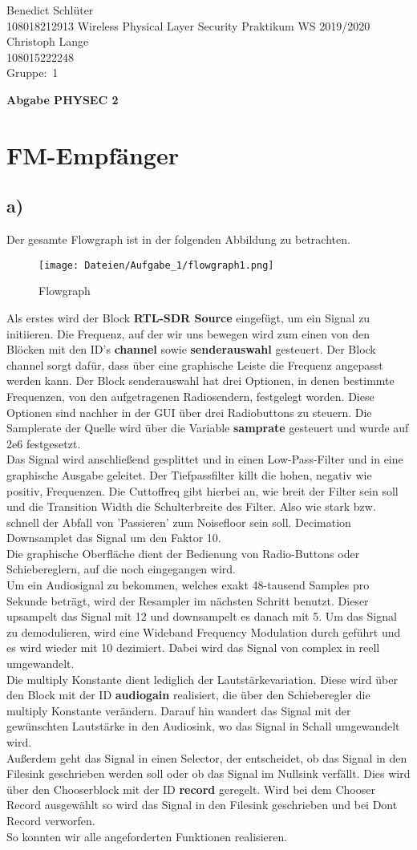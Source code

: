 \documentclass[12pt,a4paper]{article}
\newcommand{\student}{Benedict Schlüter\\ 108018212913 } %
\newcommand{\partner}{Christoph Lange\\ 108015222248} %
\newcommand{\group}{1} %
\newcommand{\hwheadtwo}{$ $
  \vspace{-2cm}
  
\noindent \student \qquad \qquad  Wireless Physical Layer Security Praktikum \hfill WS 2019/2020 \\
\noindent \partner \\
\noindent Gruppe:~\group\\
$ $

  
\begin{center}    
{\Large \bf Abgabe PHYSEC 2}
\end{center}
}
\begin{document}
\hwheadtwo

\section{FM-Empfänger}
\subsection*{a)}
Der gesamte Flowgraph ist in der folgenden Abbildung zu betrachten. 
\begin{figure}[H]
\centering
\texttt{[image: Dateien/Aufgabe\_1/flowgraph1.png]} 
\caption{Flowgraph}
\label{fig:1_1}
\end{figure}
Als erstes wird der Block \textbf{RTL-SDR Source} eingefügt, um ein Signal zu initiieren. Die Frequenz, auf der wir uns bewegen wird zum einen von den Blöcken mit den ID's \textbf{channel} sowie \textbf{senderauswahl} gesteuert. Der Block channel sorgt dafür, dass über eine graphische Leiste die Frequenz angepasst werden kann. Der Block senderauswahl hat drei Optionen, in denen bestimmte Frequenzen, von den aufgetragenen Radiosendern, festgelegt worden. Diese Optionen sind nachher in der GUI über drei Radiobuttons zu steuern. Die Samplerate der Quelle wird über die Variable \textbf{samprate} gesteuert und wurde auf 2e6 festgesetzt.\\
Das Signal wird anschließend gesplittet und in einen Low-Pass-Filter und in eine graphische Ausgabe geleitet. Der Tiefpassfilter killt die hohen, negativ wie positiv, Frequenzen. Die Cuttoffreq gibt hierbei an, wie breit der Filter sein soll und die Transition Width die Schulterbreite des Filter. Also wie stark bzw. schnell der Abfall von 'Passieren' zum Noisefloor sein soll. Decimation Downsamplet das Signal um den Faktor 10.\\ Die graphische Oberfläche dient der Bedienung von Radio-Buttons oder Schiebereglern, auf die noch eingegangen wird.\\
Um ein Audiosignal zu bekommen, welches exakt 48-tausend Samples pro Sekunde beträgt, wird der Resampler im nächsten Schritt benutzt. Dieser upsampelt das Signal mit 12 und downsampelt es danach mit 5. Um das Signal zu demodulieren, wird eine Wideband Frequency Modulation durch geführt und es wird wieder mit 10 dezimiert. Dabei wird das Signal von complex in reell umgewandelt.\\
Die multiply Konstante dient lediglich der Lautstärkevariation. Diese wird über den Block mit der ID \textbf{audiogain} realisiert, die über den Schieberegler die multiply Konstante verändern. Darauf hin wandert das Signal mit der gewünschten Lautstärke in den Audiosink, wo das Signal in Schall umgewandelt wird. \\
Außerdem geht das Signal in einen Selector, der entscheidet, ob das Signal in den Filesink geschrieben werden soll oder ob das Signal im Nullsink verfällt. Dies wird über den Chooserblock mit der ID \textbf{record} geregelt. Wird bei dem Chooser Record ausgewählt so wird das Signal in den Filesink geschrieben und bei Dont Record verworfen. \\
So konnten wir alle angeforderten Funktionen realisieren.
\end{document}
